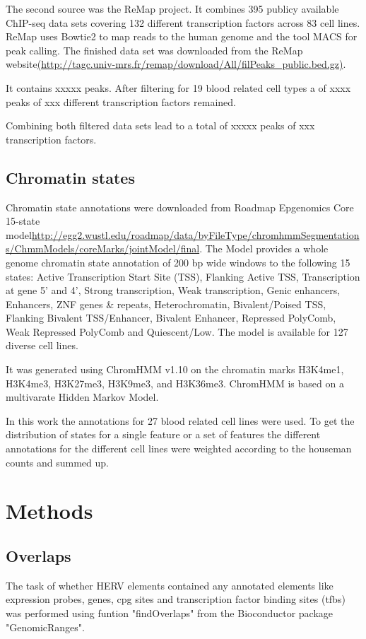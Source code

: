 \documentclass[a4paper,12pt]{article}
\begin{document}
The second source was the ReMap project\cite{10.1093/nar/gku1280}. It combines 395 publicy available ChIP-seq data sets covering 132 different transcription factors across 83 cell lines. ReMap uses Bowtie2\cite{} to map reads to the human genome and the tool MACS\cite{} for peak calling. The finished data set was downloaded from the ReMap website\url{(http://tagc.univ-mrs.fr/remap/download/All/filPeaks_public.bed.gz)}.

It contains xxxxx peaks. After filtering for 19 blood related cell types a of xxxx peaks of xxx different transcription factors remained. 

Combining both filtered data sets lead to a total of xxxxx peaks of xxx transcription factors.


\subsection{Chromatin states}
Chromatin state annotations were downloaded from Roadmap Epgenomics Core 15-state model\url{http://egg2.wustl.edu/roadmap/data/byFileType/chromhmmSegmentations/ChmmModels/coreMarks/jointModel/final}. The Model provides a whole genome chromatin state annotation of 200 bp wide windows to the following 15 states: Active Transcription Start Site (TSS), Flanking Active TSS, Transcription at gene 5' and 4', Strong transcription, Weak transcription, Genic enhancers, Enhancers, ZNF genes \& repeats, Heterochromatin, Bivalent/Poised TSS, Flanking Bivalent TSS/Enhancer, Bivalent Enhancer, Repressed PolyComb, Weak Repressed PolyComb and Quiescent/Low. The model is available for 127 diverse cell lines. 

It was generated using ChromHMM v1.10\cite{10.1038/nmeth.1906} on the chromatin marks H3K4me1, H3K4me3, H3K27me3, H3K9me3, and H3K36me3. ChromHMM is based on a multivarate Hidden Markov Model. 

In this work the annotations for 27 blood related cell lines were used. To get the distribution of states for a single feature or a set of features the different annotations for the different cell lines were weighted according to the houseman counts and summed up.

\newpage
\section{Methods}
\subsection{Overlaps}
The task of whether HERV elements contained any annotated elements like expression probes, genes, cpg sites and transcription factor binding sites (tfbs) was performed using funtion "findOverlaps" from the Bioconductor package "GenomicRanges"\cite{10.1371/journal.pcbi.1003118}. 
\end{document}

